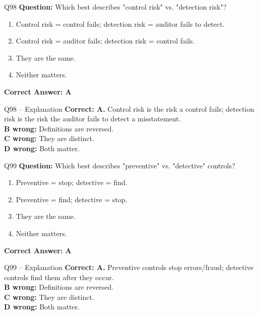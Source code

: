 \documentclass[aspectratio=169,10pt]{beamer}
\begin{document}
	\begin{frame}[t]{Q98}
		\small
		\textbf{Question:} Which best describes "control risk" vs. "detection risk"?
		\begin{enumerate}[label=\Alph*.,itemsep=1pt,topsep=2pt]
			\item Control risk = control fails; detection risk = auditor fails to detect.
			\item Control risk = auditor fails; detection risk = control fails.
			\item They are the same.
			\item Neither matters.
		\end{enumerate}
		\vspace{4pt}
		\textbf{Correct Answer: A}
	\end{frame}
	
	\begin{frame}[t]{Q98 -- Explanation}
		\small
		\textbf{Correct: A.} Control risk is the risk a control fails; detection risk is the risk the auditor fails to detect a misstatement. \\[4pt]
		\textbf{B wrong:} Definitions are reversed. \\[2pt]
		\textbf{C wrong:} They are distinct. \\[2pt]
		\textbf{D wrong:} Both matter.
	\end{frame}
	
	\begin{frame}[t]{Q99}
		\small
		\textbf{Question:} Which best describes "preventive" vs. "detective" controls?
		\begin{enumerate}[label=\Alph*.,itemsep=1pt,topsep=2pt]
			\item Preventive = stop; detective = find.
			\item Preventive = find; detective = stop.
			\item They are the same.
			\item Neither matters.
		\end{enumerate}
		\vspace{4pt}
		\textbf{Correct Answer: A}
	\end{frame}
	
	\begin{frame}[t]{Q99 -- Explanation}
		\small
		\textbf{Correct: A.} Preventive controls stop errors/fraud; detective controls find them after they occur. \\[4pt]
		\textbf{B wrong:} Definitions are reversed. \\[2pt]
		\textbf{C wrong:} They are distinct. \\[2pt]
		\textbf{D wrong:} Both matter.
	\end{frame}
	
\end{document}
